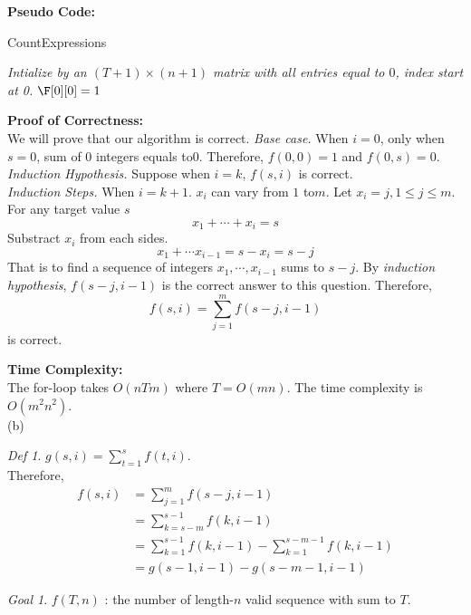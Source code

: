 \documentclass[10.5pt]{article}
\newenvironment{main idea}{\textbf{Main Idea: }}{}
\newenvironment{prcor}{\textbf{Proof of Correctness: }\\}{}
\newenvironment{pseudo}{\textbf{Pseudo Code: }\\}{}
\newenvironment{complexity}{\textbf{Time Complexity: }\\}{}
\theoremstyle{remark}
\newtheorem*{define}{Def}
\newtheorem*{goal}{Goal}
\begin{document}
\begin{pseudo}
	\begin{algorithm}[H]
		\DontPrintSemicolon

		\caption{CountExpressions}
		\BlankLine
		\emph{Intialize \F by an \((T + 1) \times (n + 1)\) matrix with all entries equal to \(0\), index start at 0.}\;
		\(\F[0][0] = 1\)\;
		\Return{\(\F[T][n]\)}
	\end{algorithm}
\end{pseudo}
\begin{prcor}
	We will prove that our algorithm is correct.
	\textit{Base case.} When \(i = 0\), only when \(s = 0\), sum of \(0\) integers equals to\(0\). Therefore, \(f(0,0) = 1\) and \(f(0, s) = 0\).\\
	\textit{Induction Hypothesis.} Suppose when \(i = k\), \(f(s, i)\) is correct.\\
	\textit{Induction Steps.} When \(i = k + 1\). \(x_i\) can vary from \(1\) to\(m\). Let \(x_i = j, 1\le j\le m\). For any target value \(s\)
	\[
		x_1 + \cdots + x_i = s
	\]
	Substract \(x_i\) from each sides.
	\[
		x_1 + \cdots x_{i - 1} = s - x_i = s - j
	\]
	That is to find a sequence of integers \(x_1, \cdots, x_{i - 1}\) sums to \(s - j\). By \textit{induction hypothesis}, \(f(s - j, i - 1)\) is the correct answer to this question.  Therefore,
	\[
		f(s, i) = \sum_{j = 1}^m f(s - j, i - 1)
	\]
	is correct.

\end{prcor}
\begin{complexity}
	The for-loop takes \(O(nTm)\) where \(T = O(mn)\).
	The time complexity is \(O(m^2n^2)\).\\
\end{complexity}
(b)\\
\begin{main idea}
\begin{define}
	\(g(s, i) = \sum_{t = 1}^s f(t, i)\). \\
	Therefore,
	\begin{align*}
		f(s, i) & = \sum_{j = 1}^m f(s - j, i - 1)                                          \\
		        & = \sum_{k = s - m}^{s - 1} f(k, i - 1)                                    \\
		        & = \sum_{k = 1}^{s - 1} f(k, i - 1) - \sum_{k = 1}^{s - m - 1} f(k, i - 1) \\
		        & = g(s - 1, i - 1) - g(s - m - 1, i - 1)
	\end{align*}
\end{define}
\begin{goal}
	\(f(T, n)\) : the number of length-\(n\) valid sequence with sum to \(T\).
\end{goal}
\end{main idea}
\end{document}

